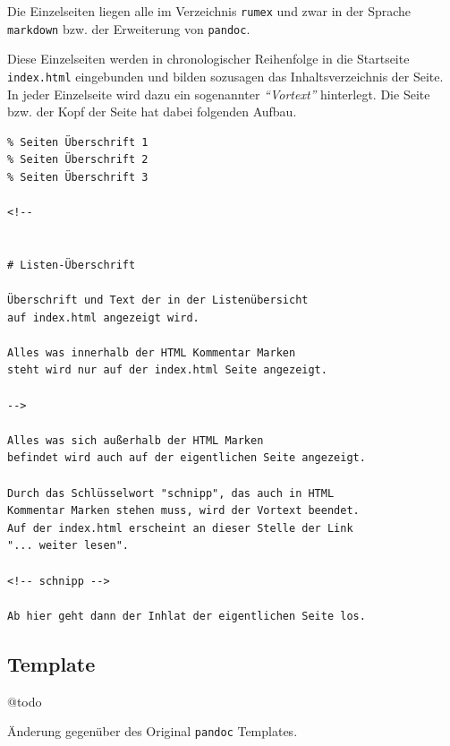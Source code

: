 \documentclass[%
fontsize=12pt,%
parskip=half,%
version=last%
]{scrreprt}
\begin{document}
Die Einzelseiten liegen alle im Verzeichnis \texttt{rumex} und zwar in
der Sprache \texttt{markdown} bzw. der Erweiterung von \texttt{pandoc}.

Diese Einzelseiten werden in chronologischer Reihenfolge in die
Startseite \texttt{index.html} eingebunden und bilden sozusagen das
Inhaltsverzeichnis der Seite. In jeder Einzelseite wird dazu ein
sogenannter \emph{``Vortext''} hinterlegt. Die Seite bzw. der Kopf der
Seite hat dabei folgenden Aufbau.

\begin{verbatim}
% Seiten Überschrift 1
% Seiten Überschrift 2
% Seiten Überschrift 3

<!--


# Listen-Überschrift

Überschrift und Text der in der Listenübersicht
auf index.html angezeigt wird.

Alles was innerhalb der HTML Kommentar Marken
steht wird nur auf der index.html Seite angezeigt.

-->

Alles was sich außerhalb der HTML Marken
befindet wird auch auf der eigentlichen Seite angezeigt.

Durch das Schlüsselwort "schnipp", das auch in HTML
Kommentar Marken stehen muss, wird der Vortext beendet.
Auf der index.html erscheint an dieser Stelle der Link
"... weiter lesen".

<!-- schnipp -->

Ab hier geht dann der Inhlat der eigentlichen Seite los.
\end{verbatim}

\subsection{Template}\label{template}

@todo

Änderung gegenüber des Original \texttt{pandoc} Templates.
\end{document}
